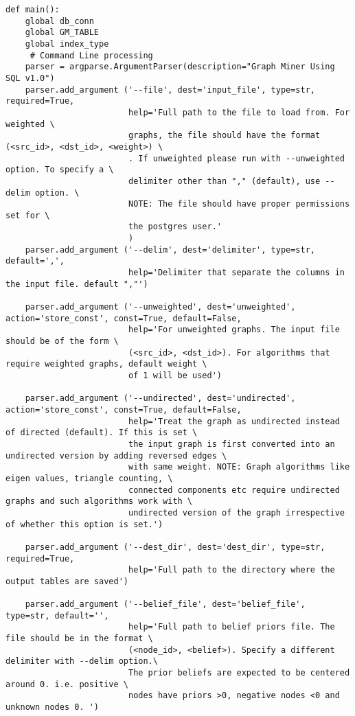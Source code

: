 \documentclass[11pt]{article}
\begin{document}
\begin{lstlisting}
def main():
    global db_conn
    global GM_TABLE
    global index_type
     # Command Line processing
    parser = argparse.ArgumentParser(description="Graph Miner Using SQL v1.0")
    parser.add_argument ('--file', dest='input_file', type=str, required=True,
                         help='Full path to the file to load from. For weighted \
                         graphs, the file should have the format (<src_id>, <dst_id>, <weight>) \
                         . If unweighted please run with --unweighted option. To specify a \
                         delimiter other than "," (default), use --delim option. \
                         NOTE: The file should have proper permissions set for \
                         the postgres user.' 
                         )
    parser.add_argument ('--delim', dest='delimiter', type=str, default=',',
                         help='Delimiter that separate the columns in the input file. default ","')
                        
    parser.add_argument ('--unweighted', dest='unweighted', action='store_const', const=True, default=False,
                         help='For unweighted graphs. The input file should be of the form \
                         (<src_id>, <dst_id>). For algorithms that require weighted graphs, default weight \
                         of 1 will be used')
                         
    parser.add_argument ('--undirected', dest='undirected', action='store_const', const=True, default=False,
                         help='Treat the graph as undirected instead of directed (default). If this is set \
                         the input graph is first converted into an undirected version by adding reversed edges \
                         with same weight. NOTE: Graph algorithms like eigen values, triangle counting, \
                         connected components etc require undirected graphs and such algorithms work with \
                         undirected version of the graph irrespective of whether this option is set.')
                         
    parser.add_argument ('--dest_dir', dest='dest_dir', type=str, required=True,
                         help='Full path to the directory where the output tables are saved')
                         
    parser.add_argument ('--belief_file', dest='belief_file', type=str, default='',
                         help='Full path to belief priors file. The file should be in the format \
                         (<node_id>, <belief>). Specify a different delimiter with --delim option.\
                         The prior beliefs are expected to be centered around 0. i.e. positive \
                         nodes have priors >0, negative nodes <0 and unknown nodes 0. ')
                         

\end{lstlisting}
\end{document}
